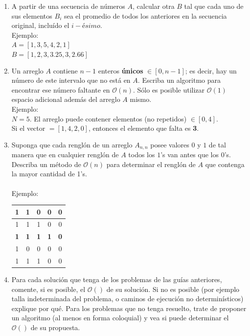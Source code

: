 \begin{enumerate}
	
\vspace{15mm}	

		
		
		\item A partir de una secuencia de números $A$, calcular otra $B$ tal que cada uno
		de sus elementos $B_i$ sea el promedio de todos los anteriores en la secuencia
		original, incluído el $i-ésimo$.\\
		Ejemplo:\\
		$A = [1, 3, 5, 4, 2, 1]$\\
		$B = [1, 2, 3, 3.25, 3, 2.66]$
		
		
		\item Un arreglo $A$ contiene $n-1$ enteros \textbf{únicos} $\in [0, n-1]$; es decir, 
		hay un número de este intervalo que no está en $A$. Escriba un algoritmo para encontrar
		ese número faltante en $\mathcal{O}(n)$. Sólo es posible utilizar $\mathcal{O}(1)$ espacio
		adicional además del arreglo $A$ mismo.\\
		Ejemplo:\\
		$N = 5$. El arreglo puede contener elementos (no repetidos) $\in [0, 4]$.\\
		Si el vector $=[1, 4, 2, 0]$, entonces el elemento que falta es \textbf{3}.
		

		\item Suponga que cada renglón de un arreglo $A_{n,n}$ posee valores $0$ y $1$ de tal
		manera que en cualquier renglón de $A$ todos los $1$'s van antes que los $0$'s. Describa
		un método de $\mathcal{O}(n)$ para determinar el renglón de $A$ que contenga la
		mayor cantidad de 1's.\\\\
		Ejemplo:
		\begin{flushleft}
  \begin{tabular}{|| c | c | c | c | c ||}
    \hline\hline
    1 & 1 & 0 & 0 & 0 \\ \hline
    1 & 1 & 1 & 0 & 0 \\ \hline
    \cellcolor{green!17}\textbf{1} & \cellcolor{green!17}\textbf{1} & \cellcolor{green!17}\textbf{1} & \cellcolor{green!17}\textbf{1} & \cellcolor{green!17}\textbf{0} \\ \hline
    1 & 0 & 0 & 0 & 0 \\ \hline
    1 & 1 & 1 & 0 & 0 \\ \hline
    \hline
  \end{tabular}
\end{flushleft}


	\item Para cada solución que tenga de los problemas de las guías anteriores, comente, si es posible, el $\mathcal{O}()$ de
	su solución. Si no es posible (por ejemplo talla indeterminada del problema, o caminos de ejecución no determinísticos) explique
	por qué. Para los problemas que no tenga resuelto, trate de proponer un algoritmo (al menos en forma coloquial) y vea
	si puede determinar el $\mathcal{O}()$ de su propuesta.
	

\end{enumerate}
